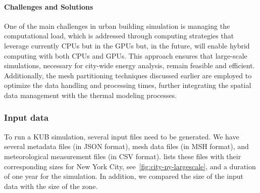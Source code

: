 \documentclass[runningheads]{llncs}
\begin{document}
\paragraph{Challenges and Solutions}
One of the main challenges in urban building simulation is managing the computational load, which is addressed through computing strategies that leverage currently CPUs but in the GPUs but, in the future, will enable hybrid computing with both CPUs and GPUs. 
This approach ensures that large-scale simulations, necessary for city-wide energy analysis, remain feasible and efficient. 
Additionally, the mesh partitioning techniques discussed earlier are employed to optimize the data handling and processing times, further integrating the spatial data management with the thermal modeling processes.





\subsubsection{Input data}

To run a KUB simulation, several input files need to be generated.
We have several metadata files (in JSON format), mesh data files (in MSH format), and meteorological measurement files (in CSV format).
 lists these files with their corresponding sizes for New York City, see~\cref{fig:city-ny-largescale}, and a duration of one year for the simulation.
In addition, we compared the size of the input data with the size of the zone.
\end{document}
